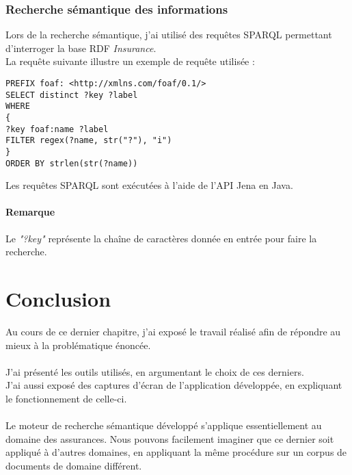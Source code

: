 \documentclass[12pt, a4paper, oneside]{book}
\begin{document}
\subsubsection{Recherche sémantique des informations}
 
 Lors de la recherche sémantique, j'ai utilisé des requêtes SPARQL permettant d'interroger la base RDF \emph{Insurance}.\\
La requête suivante illustre un exemple de requête utilisée :
\begin{verbatim}
PREFIX foaf: <http://xmlns.com/foaf/0.1/>
SELECT distinct ?key ?label
WHERE
{
?key foaf:name ?label
FILTER regex(?name, str("?"), "i")
}
ORDER BY strlen(str(?name))
\end{verbatim}

Les requêtes SPARQL sont exécutées à l'aide de l'API Jena en Java.

\paragraph{Remarque}

Le \emph{"?key"} représente la chaîne de caractères donnée en entrée pour faire la recherche.

\section{Conclusion}

Au cours de ce dernier chapitre, j'ai exposé le travail réalisé afin de répondre au mieux à la problématique énoncée.
\paragraph{}
J'ai présenté les outils utilisés, en argumentant le choix de ces derniers.\\
J'ai aussi exposé des captures d'écran de l'application développée, en expliquant le fonctionnement de celle-ci. 

\paragraph{}
Le moteur de recherche sémantique développé s'applique essentiellement au domaine des assurances.
Nous pouvons facilement imaginer que ce dernier soit appliqué à d'autres domaines, en appliquant la même procédure sur un corpus de documents de domaine différent.
 













\end{document}
